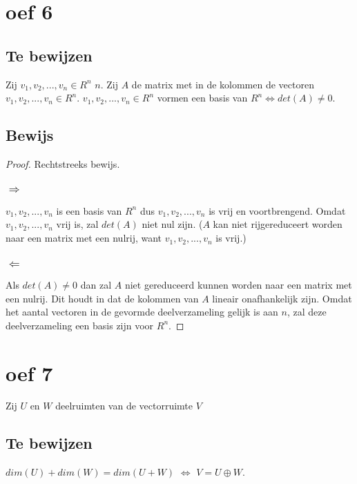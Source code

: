 \documentclass[lineaire_algebra_oplossingen.tex]{subfiles}
\begin{document}
\section{oef 6}
\subsection*{Te bewijzen}
Zij $v_1,v_2,...,v_n \in R^n$ $n$. Zij $A$ de matrix met in de kolommen de vectoren $v_1,v_2,...,v_n \in R^n$.
$v_1,v_2,...,v_n \in R^n$ vormen een basis van $R^n \Leftrightarrow det(A) \neq 0$.
\subsection*{Bewijs}
\begin{proof}
Rechtstreeks bewijs.
\subsubsection*{$\Rightarrow$}
$v_1,v_2,...,v_n$ is een basis van $R^n$ dus $v_1,v_2,...,v_n$ is vrij en voortbrengend. Omdat $v_1,v_2,...,v_n$ vrij is, zal $det(A)$ niet nul zijn. ($A$ kan niet rijgereduceert worden naar een matrix met een nulrij, want $v_1,v_2,...,v_n$ is vrij.)
\subsubsection*{$\Leftarrow$}
Als $det(A) \neq 0$ dan zal $A$ niet gereduceerd kunnen worden naar een matrix met een nulrij. Dit houdt in dat de kolommen van $A$ lineair onafhankelijk zijn. Omdat het aantal vectoren in de gevormde deelverzameling gelijk is aan $n$, zal deze deelverzameling een basis zijn voor $R^n$.
\end{proof}

\section{oef 7}
Zij $U$ en $W$ deelruimten van de vectorruimte $V$
\subsection*{Te bewijzen}
$dim(U) + dim(W) = dim(U+W)$ $\Leftrightarrow$ $V = U \oplus W$.
\end{document}

